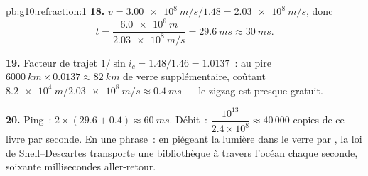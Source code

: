 \begin{solution}{pb:g10:refraction:1}
\textbf{18.} $v = \qty{3.00e8}{m/s}/1.48 = \qty{2.03e8}{m/s}$, donc
\[
t = \frac{\qty{6.0e6}{m}}{\qty{2.03e8}{m/s}} = \qty{29.6}{ms} \approx
\qty{30}{ms}.
\]

\textbf{19.} Facteur de trajet $1/\sin i_c = 1.48/1.46 = 1.0137$~: au
pire $\qty{6000}{km} \times 0.0137 \approx \qty{82}{km}$ de verre
supplémentaire, coûtant $\qty{8.2e4}{m} / \qty{2.03e8}{m/s} \approx
\qty{0.4}{ms}$ --- le zigzag est presque gratuit.

\textbf{20.} Ping~: $2 \times (29.6 + 0.4) \approx \qty{60}{ms}$.
Débit~: $\dfrac{10^{13}}{2.4 \times 10^8} \approx 40\,000$ copies de
ce livre par seconde. En une phrase~: en piégeant la lumière dans le
verre par , la
loi de Snell--Descartes transporte une bibliothèque à
travers l'océan chaque seconde, soixante millisecondes aller-retour.
\end{solution}
